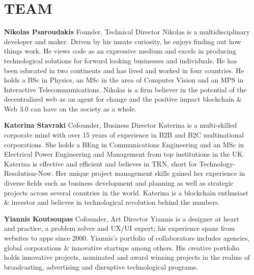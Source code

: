 \newpage
\section{TEAM} \label{team}
\bigskip
\noindent
\textbf{Nikolas Psaroudakis} \newline
\medskip Founder, Technical Director
\newline
Nikolas is a multidisciplinary developer and maker. Driven by his innate curiosity, he enjoys finding out how things work. He views code as an expressive medium and excels in producing technological solutions for forward looking businesses and individuals. He has been educated in two continents and has lived and worked in four countries. He holds a BSc in Physics, an MSc in the area of Computer Vision and an MPS in Interactive Telecommunications. Nikolas is a firm believer in the potential of the decentralized web as an agent for change and the positive impact blockchain \& Web 3.0 can have on the society as a whole.\par

\bigskip
\noindent
\textbf{Katerina Stavraki}\newline
\medskip Cofounder, Business Director
\newline
Katerina is a multi-skilled corporate mind with over 15 years of experience in B2B and B2C multinational corporations. She holds a BEng in Communications Engineering and an MSc in Electrical Power Engineering and Management from top institutions in the UK. Katerina is effective and efficient and believes in TRN, short for Technology-Resolution-Now. Her unique project management skills gained her experience in diverse fields such as business development and planning as well as strategic projects across several countries in the world. Katerina is a blockchain enthusiast \& investor and believes in technological revolution behind the numbers.\par


\bigskip
\noindent
\textbf{Yiannis Koutsoupas}\newline
\medskip Cofounder, Art Director
\newline
Yiannis is a designer at heart and practice, a problem solver and UX/UI expert; his experience spans from websites to apps since 2000. Yiannis’s portfolio of collaborators includes agencies, global corporations \& innovative startups among others. His creative portfolio holds innovative projects, nominated and award winning projects in the realms of broadcasting, advertising and disruptive technological programs.
 \par

